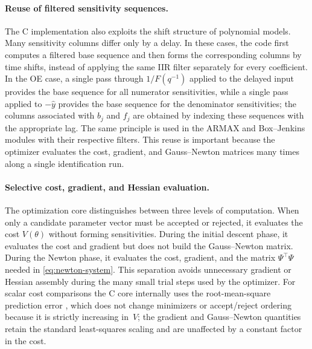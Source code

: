 \documentclass[acmsmall,screen,review]{acmart}
\begin{document}
\paragraph{Reuse of filtered sensitivity sequences.}
The C implementation also exploits the shift structure of polynomial
models.  Many sensitivity columns differ only by a delay.  In these cases,
the code first computes a filtered base sequence and then forms the
corresponding columns by time shifts, instead of applying the same IIR
filter separately for every coefficient.  In the OE case, a single pass
through $1/F(q^{-1})$ applied to the delayed input provides the base
sequence for all numerator sensitivities, while a single pass applied to
$-\hat{y}$ provides the base sequence for the denominator sensitivities;
the columns associated with $b_j$ and $f_j$ are obtained by indexing these
sequences with the appropriate lag.  The same principle is used in the
ARMAX and Box--Jenkins modules with their respective filters.  This reuse is
important because the optimizer evaluates the cost, gradient, and
Gauss--Newton matrices many times along a single identification run.

\paragraph{Selective cost, gradient, and Hessian evaluation.}
The optimization core distinguishes between three levels of computation.
When only a candidate parameter vector must be accepted or rejected, it
evaluates the cost $V(\theta)$ without forming sensitivities.  During the
initial descent phase, it evaluates the cost and gradient but does not build
the Gauss--Newton matrix.  During the Newton phase, it evaluates the cost,
gradient, and the matrix $\Psi^\top\Psi$ needed in
\eqref{eq:newton-system}.  This separation avoids unnecessary gradient or
Hessian assembly during the many small trial steps used by the optimizer.
For scalar cost comparisons the C core internally uses the
root-mean-square prediction error , which
does not change minimizers or accept/reject ordering because it is
strictly increasing in~$V$; the gradient and Gauss--Newton quantities
retain the standard least-squares scaling and are unaffected by a
constant factor in the cost.
\end{document}
